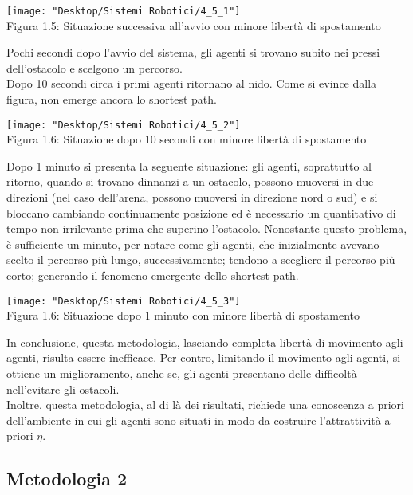 \documentclass[12pt,a4paper,openright,twoside]{report}
\begin{document}
\begin{center}  
	\texttt{[image: "Desktop/Sistemi Robotici/4\_5\_1"]}
	\\Figura 1.5: Situazione successiva all'avvio con minore libertà di spostamento
\end{center}

Pochi secondi dopo l'avvio del sistema, gli agenti si trovano subito nei pressi dell'ostacolo e scelgono un percorso.\\
Dopo 10 secondi circa i primi agenti ritornano al nido. Come si evince dalla figura, non emerge ancora lo shortest path.

\begin{center}  
	\texttt{[image: "Desktop/Sistemi Robotici/4\_5\_2"]}
	\\Figura 1.6: Situazione dopo 10 secondi con minore libertà di spostamento
\end{center}

Dopo 1 minuto si presenta la seguente situazione: gli agenti, soprattutto al ritorno, quando si trovano dinnanzi a un ostacolo, possono muoversi in due direzioni (nel caso dell'arena, possono muoversi in direzione nord o sud) e si bloccano cambiando continuamente posizione ed è necessario un quantitativo di tempo non irrilevante prima che superino l'ostacolo. Nonostante questo problema, è sufficiente un minuto, per notare come gli agenti, che inizialmente avevano scelto il percorso più lungo, successivamente; tendono a scegliere il percorso più corto; generando il fenomeno emergente dello shortest path.

\begin{center}  
	\texttt{[image: "Desktop/Sistemi Robotici/4\_5\_3"]}
	\\Figura 1.6: Situazione dopo 1 minuto con minore libertà di spostamento
\end{center}

In conclusione, questa metodologia, lasciando completa libertà di movimento agli agenti, risulta essere inefficace. Per contro, limitando il movimento agli agenti, si ottiene un miglioramento, anche se, gli agenti presentano delle difficoltà nell'evitare gli ostacoli.\\
Inoltre, questa metodologia, al di là dei risultati, richiede una conoscenza a priori dell'ambiente in cui gli agenti sono situati in modo da costruire l'attrattività a priori $\eta$.

\subsection{Metodologia 2}
\end{document}
